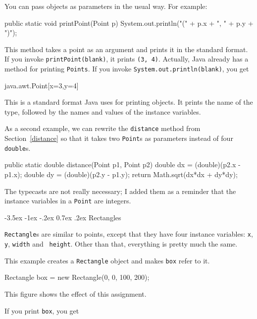 \documentclass{book}
\makeatletter
\renewcommand{\section}{\@startsection 
    {section} {1} {0mm}%
    {-3.5ex \@plus -1ex \@minus -.2ex}%
    {0.7ex \@plus.2ex}%
    {\normalfont\Large\bfseries}}
\makeatother
\begin{document}
You can pass objects as parameters in the usual way.  For
example:

\begin{verbatimtab}
  public static void printPoint(Point p) {
    System.out.println("(" + p.x + ", " + p.y + ")");
  }
\end{verbatimtab}
%
This method takes a point as an argument and prints it in
the standard format.  If you invoke {\tt printPoint(blank)},
it prints {\tt(3, 4)}.  Actually, Java already has a
method for printing {\tt Points}.  If you invoke
{\tt System.out.println(blank)}, you get

\begin{verbatimtab}
java.awt.Point[x=3,y=4]
\end{verbatimtab}
% 
This is a standard format Java uses for printing objects.  It prints
the name of the type, followed by the names and values of the instance
variables.

As a second example, we can rewrite the {\tt distance} method from
Section~\ref{distance} so that it takes two {\tt Point}s as parameters
instead of four {\tt double}s.

\begin{verbatimtab}
  public static double distance(Point p1, Point p2) {
    double dx = (double)(p2.x - p1.x);
    double dy = (double)(p2.y - p1.y);
    return Math.sqrt(dx*dx + dy*dy);
  }
\end{verbatimtab}
%
The typecasts are not really necessary; I added them as a
reminder that the instance variables in a {\tt Point} are integers.


\section{Rectangles}

{\tt Rectangle}s are similar to points, except that they have four
instance variables: {\tt x}, {\tt y}, {\tt width} and {\tt
height}.  Other than that, everything is pretty much the same.

This example
creates a {\tt Rectangle} object and makes {\tt box} refer to it.

\begin{verbatimtab}
    Rectangle box = new Rectangle(0, 0, 100, 200);
\end{verbatimtab}
%
This figure shows the effect of this assignment.



%
If you print {\tt box}, you get
\end{document}
